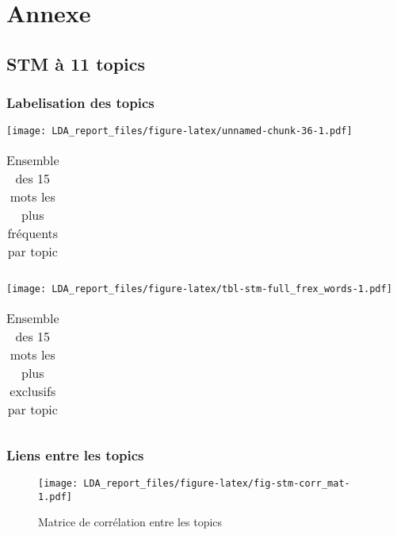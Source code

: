 \documentclass[
  letterpaper,
  DIV=11,
  numbers=noendperiod]{scrartcl}
\begin{document}
\hypertarget{annexe}{%
\section{Annexe}\label{annexe}}

\hypertarget{stm-uxe0-11-topics}{%
\subsection{STM à 11 topics}\label{stm-uxe0-11-topics}}

\hypertarget{labelisation-des-topics}{%
\subsubsection{Labelisation des topics}\label{labelisation-des-topics}}

\texttt{[image: LDA\_report\_files/figure-latex/unnamed-chunk-36-1.pdf]}

\begin{table}
\caption{Ensemble des 15 mots les plus fréquents par topic}\tabularnewline

\centering
\begin{tabular}{}
\hline

\hline
\end{tabular}
\end{table}

\texttt{[image: LDA\_report\_files/figure-latex/tbl-stm-full\_frex\_words-1.pdf]}

\hypertarget{tbl-stm-full_frex_words}{}
\begin{table}
\caption{\label{tbl-stm-full_frex_words}Ensemble des 15 mots les plus exclusifs par topic }\tabularnewline

\centering
\begin{tabular}{}
\hline

\hline
\end{tabular}
\end{table}

\hypertarget{liens-entre-les-topics}{%
\subsubsection{Liens entre les topics}\label{liens-entre-les-topics}}

\begin{figure}

{\centering \texttt{[image: LDA\_report\_files/figure-latex/fig-stm-corr\_mat-1.pdf]}

}

\caption{\label{fig-stm-corr_mat}Matrice de corrélation entre les
topics}

\end{figure}
\end{document}
